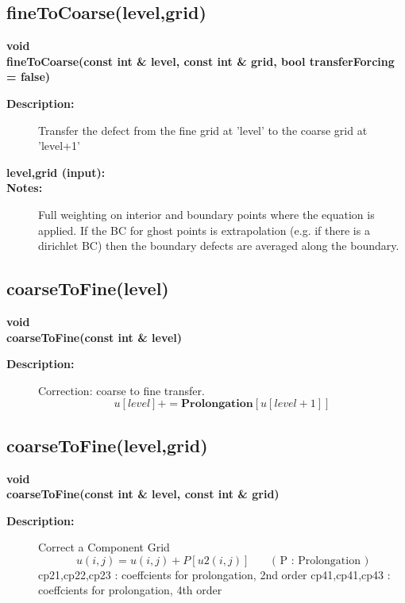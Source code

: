 \subsection{fineToCoarse(level,grid)}
 
\begin{flushleft} \textbf{%
void  \\ 
\settowidth{\OgmgIncludeArgIndent}{fineToCoarse(}%
fineToCoarse(const int \& level, const int \& grid, bool transferForcing  = false)
}\end{flushleft}
\begin{description}
\item[{\bf Description:}] 
     Transfer the defect from the fine grid at 'level' to the coarse grid at 'level+1'
\item[{\bf level,grid (input):}] 

\item[{\bf Notes:}] 
   Full weighting on interior and boundary points where the equation is applied.
  If the BC for ghost points is extrapolation (e.g. if there is a dirichlet BC) then the
  boundary defects are averaged along the boundary. 

\end{description}
\subsection{coarseToFine(level)}
 
\begin{flushleft} \textbf{%
void  \\ 
\settowidth{\OgmgIncludeArgIndent}{coarseToFine(}%
coarseToFine(const int \& level) 
}\end{flushleft}
\begin{description}
\item[{\bf Description:}] 
    Correction: coarse to fine transfer.
 \[
          u[level] += \textbf{Prolongation}[ u[level+1] ]
 \]
\end{description}
\subsection{coarseToFine(level,grid)}
 
\begin{flushleft} \textbf{%
void  \\ 
\settowidth{\OgmgIncludeArgIndent}{coarseToFine(}%
coarseToFine(const int \& level, const int \& grid)
}\end{flushleft}
\begin{description}
\item[{\bf Description:}] 
  Correct a Component Grid
 \[
      u(i,j) = u(i,j) + P[ u2(i,j) ]   \qquad\textrm{( P : Prolongation )}
 \]
  cp21,cp22,cp23 : coeffcients for prolongation, 2nd order
  cp41,cp41,cp43 : coeffcients for prolongation, 4th order

\end{description}

